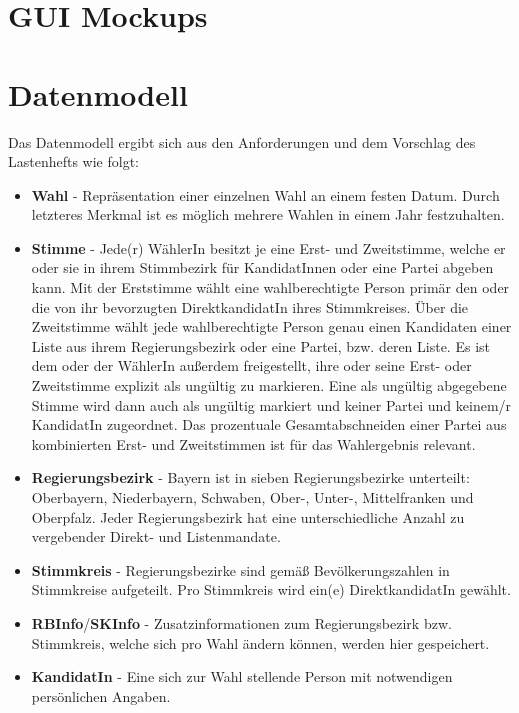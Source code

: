 \documentclass[a4paper,12pt]{article}
\begin{document}
\section{GUI Mockups}


\section{Datenmodell}
Das Datenmodell ergibt sich aus den Anforderungen und dem Vorschlag des Lastenhefts wie folgt:
\begin{itemize}
  \item \textbf{Wahl} - Repräsentation einer einzelnen Wahl an einem festen Datum. 
        Durch letzteres Merkmal ist es möglich mehrere Wahlen in einem Jahr festzuhalten.
  \item \textbf{Stimme} - Jede(r) WählerIn besitzt je eine Erst- und Zweitstimme, welche er oder sie in ihrem
        Stimmbezirk für KandidatInnen oder eine Partei abgeben kann. Mit der Erststimme wählt eine wahlberechtigte Person
        primär den oder die von ihr bevorzugten DirektkandidatIn ihres Stimmkreises. Über die Zweitstimme wählt 
        jede wahlberechtigte Person genau einen Kandidaten einer Liste aus ihrem Regierungsbezirk oder eine Partei, bzw. deren Liste. 
        Es ist dem oder der WählerIn außerdem freigestellt, ihre oder seine Erst- oder Zweitstimme explizit als ungültig zu markieren. Eine als ungültig abgegebene Stimme wird dann auch als ungültig markiert und keiner Partei und keinem/r KandidatIn zugeordnet. 
        Das prozentuale Gesamtabschneiden einer Partei aus kombinierten Erst- und Zweitstimmen ist für das 
        Wahlergebnis relevant.
  \item \textbf{Regierungsbezirk} - Bayern ist in sieben Regierungsbezirke unterteilt: Oberbayern,
        Niederbayern, Schwaben, Ober-, Unter-, Mittelfranken und Oberpfalz. Jeder Regierungsbezirk
        hat eine unterschiedliche Anzahl zu vergebender Direkt- und Listenmandate.
  \item \textbf{Stimmkreis} - Regierungsbezirke sind gemäß Bevölkerungszahlen in Stimmkreise aufgeteilt.
        Pro Stimmkreis wird ein(e) DirektkandidatIn gewählt.
  \item \textbf{RBInfo}/\textbf{SKInfo} - Zusatzinformationen zum Regierungsbezirk bzw. Stimmkreis,
        welche sich pro Wahl ändern können, werden hier gespeichert.
  \item \textbf{KandidatIn} - Eine sich zur Wahl stellende Person mit notwendigen persönlichen Angaben. 

\end{itemize}
\end{document}
